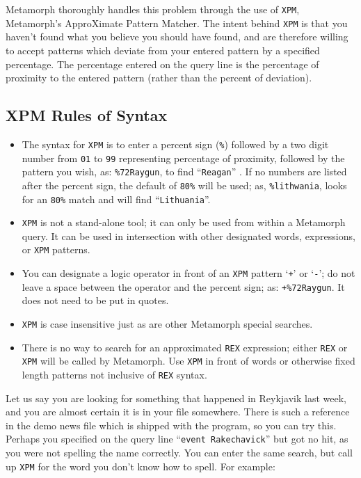 Metamorph thoroughly handles this problem through the use of
\verb`XPM`, Metamorph's ApproXimate Pattern Matcher.  The intent
behind \verb`XPM` is that you haven't found what you believe you
should have found, and are therefore willing to accept patterns which
deviate from your entered pattern by a specified percentage.  The
percentage entered on the query line is the percentage of proximity to
the entered pattern (rather than the percent of deviation).

\subsection{XPM Rules of Syntax}

\begin{itemize}
\item The syntax for \verb`XPM` is to enter a percent sign (\verb`%`) followed
    by a two digit number from \verb`01` to \verb`99` representing percentage of proximity,
    followed by the pattern you wish, as:  \verb`%72Raygun`, to find
    ``\verb`Reagan`'' . If no numbers are listed after the percent sign, the
    default of \verb`80%` will be used; as, \verb`%lithwania`, looks for an
    \verb`80%` match and will find ``\verb`Lithuania`''.

\item \verb`XPM` is not a stand-alone tool; it can only be used from within
    a Metamorph query.  It can be used in intersection with other
    designated words, expressions, or \verb`XPM` patterns.

\item You can designate a logic operator in front of an \verb`XPM` pattern `\verb`+`'
    or `\verb`-`'; do not leave a space between the operator and the percent sign; as:
    \verb`+%72Raygun`.  It does not need to be put in quotes.

\item \verb`XPM` is case insensitive just as are other Metamorph
    special searches.

\item There is no way to search for an approximated \verb`REX` expression; either
    \verb`REX` or \verb`XPM` will be called by Metamorph.  Use \verb`XPM` in front
    of words or otherwise fixed length patterns not inclusive of \verb`REX` syntax.
\end{itemize}

Let us say you are looking for something that happened in Reykjavik
last week, and you are almost certain it is in your file somewhere.
There is such a reference in the demo news file which is shipped with
the program, so you can try this.  Perhaps you specified on the
query line ``\verb`event Rakechavick`'' but got no
hit, as you were not spelling the name correctly.  You can enter the
same search, but call up \verb`XPM` for the word you don't know how to
spell.  For example:

